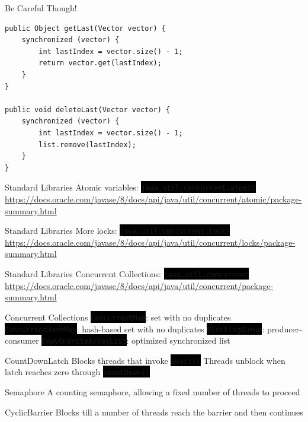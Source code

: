 \documentclass[
14pt,
aspectratio=169,
usenames,
dvipsnames,
x11names]{beamer}
\newcommand{\code}[1]{{\colorbox{black}{\color{green}\texttt{#1}}}}
\begin{document}
\begin{frame}[fragile]{Be Careful Though!}
\begin{lstlisting}
public Object getLast(Vector vector) {
    synchronized (vector) {
        int lastIndex = vector.size() - 1;
        return vector.get(lastIndex);
    }
}

public void deleteLast(Vector vector) {
    synchronized (vector) {
        int lastIndex = vector.size() - 1;
        list.remove(lastIndex);
    }
}
\end{lstlisting}
\end{frame}

\begin{frame}{Standard Libraries}
  Atomic variables: \code{java.util.concurrent.atomic}
  \vfill
  \url{https://docs.oracle.com/javase/8/docs/api/java/util/concurrent/atomic/package-summary.html}
\end{frame}

\begin{frame}{Standard Libraries}
  More locks: \code{java.util.concurrent.locks}
  \vfill
  \url{https://docs.oracle.com/javase/8/docs/api/java/util/concurrent/locks/package-summary.html}
\end{frame}

\begin{frame}{Standard Libraries}
  Concurrent Collections: \code{java.util.concurrent}
  \vfill
  \url{https://docs.oracle.com/javase/8/docs/api/java/util/concurrent/package-summary.html}
\end{frame}

\begin{frame}{Concurrent Collections}
  \code{ConcurrentMap}: set with no duplicates
  \vfill
  \code{ConcurrentHashMap}: hash-based set with no duplicates
  \vfill
  \code{BlockingQueue}: producer-consumer
  \vfill
  \code{CopyOnWriteArrayList}: optimized synchronized list
\end{frame}

\begin{frame}{CountDownLatch}
  Blocks threads that invoke \code{await()}
  \vfill
  Threads unblock when latch reaches zero through \code{countDown()}
\end{frame}

\begin{frame}{Semaphore}
  A counting semaphore, allowing a fixed number of threads to proceed
\end{frame}

\begin{frame}{CyclicBarrier}
  Blocks till a number of threads reach the barrier and then continues
\end{frame}
\end{document}
